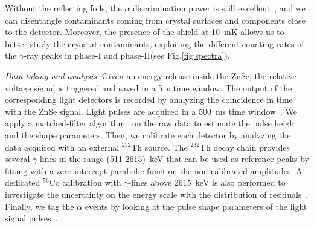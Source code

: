 \documentclass[%
reprint,
superscriptaddress,
altaffilletter,
showpacs,
showkeys,
amsmath, amssymb, aps,prl, floatfix
]{revtex4-1}
\newcommand{\phone}{phase-I\xspace}
\newcommand{\phtwo}{phase-II\xspace}
\begin{document}
Without the reflecting foils, the $\alpha$ discrimination power is still excellent~\cite{CUPID:2022puj}, and we can disentangle contaminants coming from crystal surfaces and components close to the detector. 
Moreover, the presence of the shield at 10~mK allows us to better study the cryostat contaminants, exploiting the different counting rates of the $\gamma$-ray peaks in \phone and \phtwo (see Fig.\ref{fig:spectra}).

{\it Data taking and analysis.} Given an energy release inside the ZnSe, the relative voltage signal is triggered and saved in a 5~s time window. The output of the corresponding light detectors is recorded by analyzing the coincidence in time with the ZnSe signal. Light pulses are acquired in a 500~ms time window~\cite{DiDomizio:2018ldc}.
We apply a matched-filter algorithm~\cite{Gatti:1986cw} on the raw data to estimate the pulse height and the shape parameters. Then, we calibrate each detector by analyzing the data acquired with an external $^{232}$Th source. The $^{232}$Th decay chain provides several $\gamma$-lines in the range (511-2615)~keV that can be used as reference peaks by fitting with a zero intercept parabolic function the non-calibrated amplitudes. A dedicated $^{56}$Co calibration with $\gamma$-lines above 2615~keV is also performed to investigate the uncertainty on the energy scale with the distribution of residuals~\cite{Azzolini:2019tta}. Finally, we tag the $\alpha$ events by looking at the pulse shape parameters of the light signal pulses~\cite{Azzolini:2018yye}. %
\end{document}
